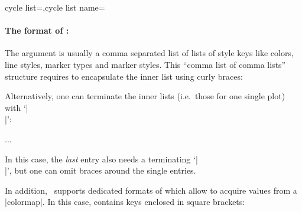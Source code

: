 \begin{pgfplotskeylist}{cycle list=,cycle list name=}
\paragraph{The format of :} The argument  is usually a comma separated list of lists of style keys like colors, line styles, marker types and marker styles. This ``comma list of comma lists'' structure requires to encapsulate the inner list using curly braces:
\begin{codeexample}
\end{codeexample}
Alternatively, one can terminate the inner lists (i.e.\ those for one single plot) with `|\\|':
\begin{codeexample}
\begin{axis}[cycle list={%
	blue,mark=*\\%
	red,mark=square\\%
	dashed,mark=o\\%
	loosely dotted,mark=+\\%
	brown!60!black,mark options={fill=brown!40},mark=otimes*\\%
}
]
...
\end{axis}
\end{codeexample}
In this case, the \emph{last} entry also needs a terminating `|\\|', but one can omit braces around the single entries.

In addition, \PGFPlots\ supports dedicated formats of  which allow to acquire values from a |colormap|. In this case,  contains keys enclosed in square brackets:

{%


}
\end{pgfplotskeylist}
